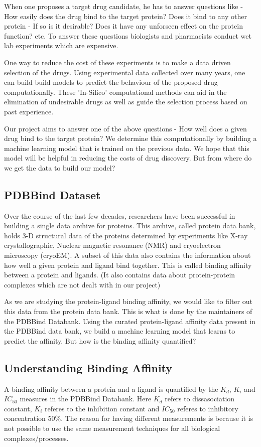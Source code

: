 \documentclass[11pt]{article}
\begin{document}
When one proposes a target drug candidate, he has to answer questions
like - How easily does the drug bind to the target protein?
Does it bind to any other protein - If so is it desirable?
Does it have any unforseen effect on the protein function?
etc.
To answer these questions biologists and pharmacists conduct wet lab experiments which are expensive.

One way to reduce the cost of these experiments is to make a data driven selection of the drugs.
Using experimental data collected over many years, one can build build models to predict the
behaviour of the proposed drug computationally.
These 'In-Silico' computational methods can aid in the elimination of undesirable drugs as well
as guide the selection process based on past experience.

Our project aims to answer one of the above questions - How well does a given drug bind to the target protein?
We determine this computationally by building a machine learning model that is trained on the previous data.
We hope that this model will be helpful in reducing the costs of drug discovery.
But from where do we get the data to build our model?

\subsection{PDBBind Dataset}
Over the course of the last few decades, researchers have been successful in building a single data archive for proteins.
This archive, called protein data bank, holds 3-D structural data of the proteins determined by experiments
like X-ray crystallographic, Nuclear magnetic resonance (NMR) and cryoelectron microscopy (cryoEM).
A subset of this data also contains the information about how well a given protein and ligand bind together.
This is called binding affinity between a protein and ligands.
(It also contains data about protein-protein complexes which are not dealt with in our project)
\cite{pdbank_history}

As we are studying the protein-ligand binding affinity, we would like to filter out this data
from the protein data bank.
This is what is done by the maintainers of the PDBBind Databank.
\cite{pdbbind_introduction}
Using the curated protein-ligand affinity data present in the PDBBind data bank, we build a machine learning
model that learns to predict the affinity.
But how is the binding affinity quantified?

\subsection{Understanding Binding Affinity}
A binding affinity between a protein and a ligand is quantified by the $K_d$, $K_i$ and $IC_{50}$ measures in the
PDBBind Databank.
Here $K_d$ refers to dissasociation constant, $K_i$ referes to the inhibition constant and $IC_{50}$ referes to 
inhibitory concentration 50\%.
The reason for having different measurements is because it is not possible to use the same measurement techniques
for all biological complexes/processes.
\end{document}
